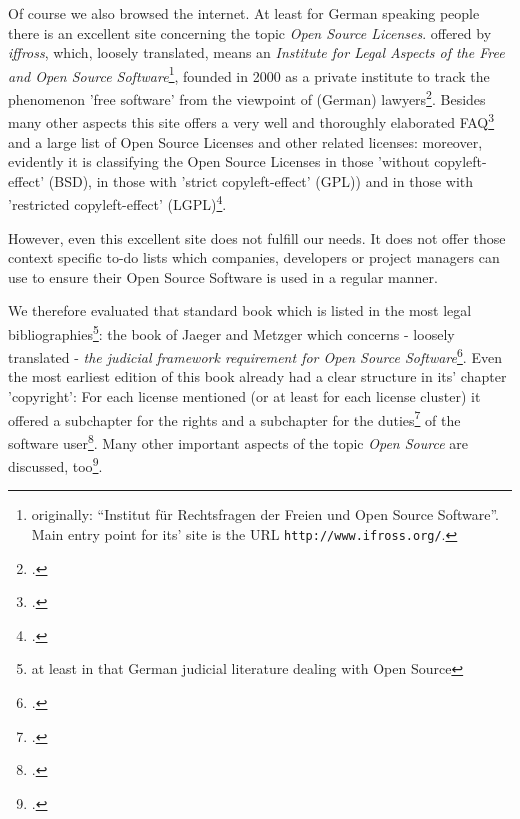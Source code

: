 Of course we also browsed the internet. At least for German speaking people
there is an excellent site concerning the topic \emph{Open Source Licenses}.
offered by \textit{iffross}, which, loosely translated, means an
\textit{Institute for Legal Aspects of the Free and Open Source
Software}\footnote{originally: \enquote{Institut für Rechtsfragen der Freien und
Open Source Software}. Main entry point for its' site is the URL
\texttt{http://www.ifross.org/}.}, founded in 2000 as a private institute to
track the phenomenon 'free software' from the viewpoint of (German)
lawyers\footcite[cf.][\nopage wp]{ifross2011b}. Besides many other
aspects this site offers a very well and thoroughly elaborated
FAQ\footcite[cf.][\nopage wp]{ifross2011c} and a large list of Open
Source Licenses and other related licenses: moreover, evidently it is
classifying the Open Source Licenses in those 'without copyleft-effect' (BSD),
in those with 'strict copyleft-effect' (GPL)) and in those with 'restricted
copyleft-effect' (LGPL)\footcite[cf.][\nopage wp]{ifross2011a}.

However, even this excellent site does not fulfill our needs. It does not offer
those context specific to-do lists which companies, developers or project
managers can use to ensure their Open Source Software is used in a regular
manner.

We therefore evaluated that standard book which is listed in the most legal
bibliographies\footnote{at least in that German judicial literature dealing with
Open Source}: the book of Jaeger and Metzger which concerns - loosely translated
- \textit{the judicial framework requirement for Open Source
Software}\footcite[cf.][V - It can not be any surprise that both authors,
Mr. Jaeger and Mr. Metzger are members of ifross (cf.
\texttt{http://www.ifross.org/personen/}, wp.)]{JaeMet2002a}. Even the most
earliest edition of this book already had a clear structure in its' chapter
'copyright': For each license mentioned (or at least for each license cluster)
it offered a subchapter for the rights and a subchapter for the
duties\footcite[cf.][30ff]{JaeMet2002a} of the software user\footcite[For
getting a good survey of the structure and the line of thought see the contents
cf.][VIIIf]{JaeMet2002a}. Many other important aspects of the topic
\textit{Open Source} are discussed, too\footcite[pars pro toto: have a
look at the chapter concerning the liability: cf.][137ff]{JaeMet2002a}.

